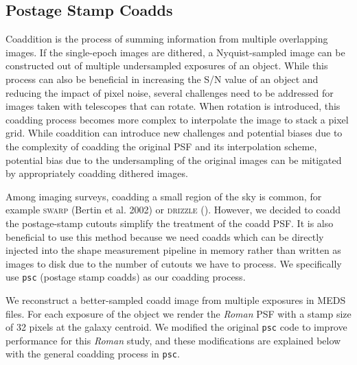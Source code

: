 \documentclass[fleqn,usenatbib]{mnras}
\begin{document}
\subsection{Postage Stamp Coadds}
\label{subsec:psc}
Coaddition is the process of summing information from multiple overlapping images. If the single-epoch images are dithered, a Nyquist-sampled image can be constructed out of multiple undersampled exposures of an object. While this process can also be beneficial in increasing the S/N value of an object and reducing the impact of pixel noise, several challenges need to be addressed for images taken with telescopes that can rotate. When rotation is introduced, this coadding process becomes more complex to interpolate the image to stack a pixel grid. While coaddition can introduce new challenges and potential biases due to the complexity of coadding the original PSF and its interpolation scheme, potential bias due to the undersampling of the original images can be mitigated by appropriately coadding dithered images. 

Among imaging surveys, coadding a small region of the sky is common, for example \textsc{swarp} (Bertin et al. 2002) or \textsc{drizzle} (\citealt{2002PASP..114..144F}). However, we decided to coadd the postage-stamp cutouts simplify the treatment of the coadd PSF. It is also beneficial to use this method because we need coadds which can be directly injected into the shape measurement pipeline in memory rather than written as images to disk due to the number of cutouts we have to process. We specifically use \texttt{psc} (postage stamp coadds) as our coadding process.

We reconstruct a better-sampled coadd image from multiple exposures in MEDS files. For each exposure of the object we render the \emph{Roman} PSF with a stamp size of 32 pixels at the galaxy centroid. We modified the original \texttt{psc} code to improve performance for this \emph{Roman} study, and these modifications are explained below with the general coadding process in \texttt{psc}. 
\end{document}
